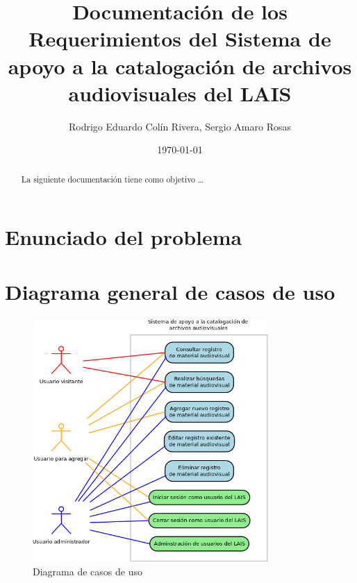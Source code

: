 \documentclass[10pt,letterpaper]{article}
\begin{document}
\title{Documentación de los Requerimientos del Sistema de apoyo a la catalogación de archivos audiovisuales del LAIS}
\author{Rodrigo Eduardo Colín Rivera, Sergio Amaro Rosas}
\date{\today}
\maketitle

\begin{abstract}
La siguiente documentación tiene como objetivo \ldots
\end{abstract}

\tableofcontents %
\newpage

\setcounter{secnumdepth}{0} %
\setcounter{tocdepth}{0} %
\graphicspath{{../Diagramas/}{../Screenshots}} %

\section{Enunciado del problema}

\section{Diagrama general de casos de uso}
\begin{figure}[H]
	\centering
	\includegraphics[width=0.8\textwidth]{CasosDeUso.png}
	\caption{Diagrama de casos de uso}
	\label{fig:caso_de_uso}
\end{figure}
\end{document}
